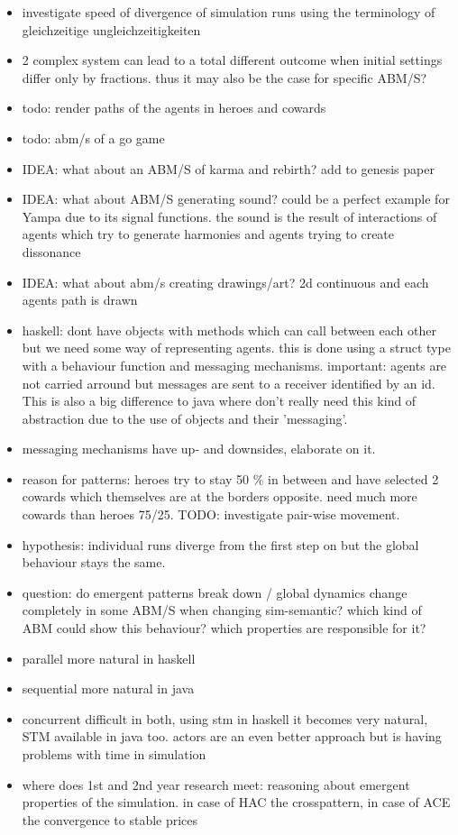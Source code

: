 \begin{itemize}
\item investigate speed of divergence of simulation runs using the terminology of gleichzeitige ungleichzeitigkeiten
\item 2 complex system can lead to a total different outcome when initial settings differ only by fractions. thus it may also be the case for specific ABM/S?
\item todo: render paths of the agents in heroes and cowards
\item todo: abm/s of a go game
\item IDEA: what about an ABM/S of karma and rebirth? add to genesis paper
\item IDEA: what about ABM/S generating sound? could be a perfect example for Yampa due to its signal functions. the sound is the result of interactions of agents which try to generate harmonies and agents trying to create dissonance
\item IDEA: what about abm/s creating drawings/art? 2d continuous and each agents path is drawn
\item haskell: dont have objects with methods which can call between each other but we need some way of representing agents. this is done using a struct type with a behaviour function and messaging mechanisms. important: agents are not carried arround but messages are sent to a receiver identified by an id. This is also a big difference to java where don't really need this kind of abstraction due to the use of objects and their 'messaging'. 
\item messaging mechanisms have up- and downsides, elaborate on it.
\item reason for patterns: heroes try to stay 50 \% in between and have selected 2 cowards which themselves are at the borders opposite. need much more cowards than heroes 75/25. TODO: investigate pair-wise movement.
\item hypothesis: individual runs diverge from the first step on but the global behaviour stays the same.
\item question: do emergent patterns break down / global dynamics change completely in some ABM/S when changing sim-semantic? which kind of ABM could show this behaviour? which properties are responsible for it?
\item parallel more natural in haskell
\item sequential more natural in java
\item concurrent difficult in both, using stm in haskell it becomes very natural, STM available in java too. actors are an even better approach but is having problems with time in simulation
\item where does 1st and 2nd year research meet: reasoning about emergent properties of the simulation. in case of HAC the crosspattern, in case of ACE the convergence to stable prices


\end{itemize}
